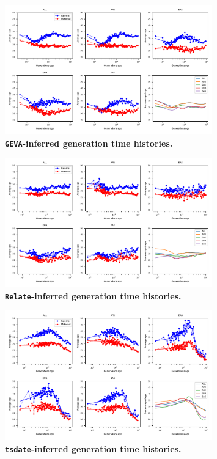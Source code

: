 \documentclass[]{article}
\begin{document}
\begin{figure}[ht!]
    \centering
    \includegraphics[width=0.8\textwidth]{../plots/inferred_generation_times.geva.pdf}
    \caption{
        \textbf{\texttt{GEVA}-inferred generation time histories.}
    }
    \label{fig:geva-gen-times}
\end{figure}


\begin{figure}[ht!]
    \centering
    \includegraphics[width=0.8\textwidth]{../plots/inferred_generation_times.relate.pdf}
    \caption{
        \textbf{\texttt{Relate}-inferred generation time histories.}
    }
    \label{fig:relate-gen-times}
\end{figure}


\begin{figure}[ht!]
    \centering
    \includegraphics[width=0.8\textwidth]{../plots/inferred_generation_times.tsdate.pdf}
    \caption{
        \textbf{\texttt{tsdate}-inferred generation time histories.}
    }
    \label{fig:tsdate-gen-times}
\end{figure}
\end{document}
